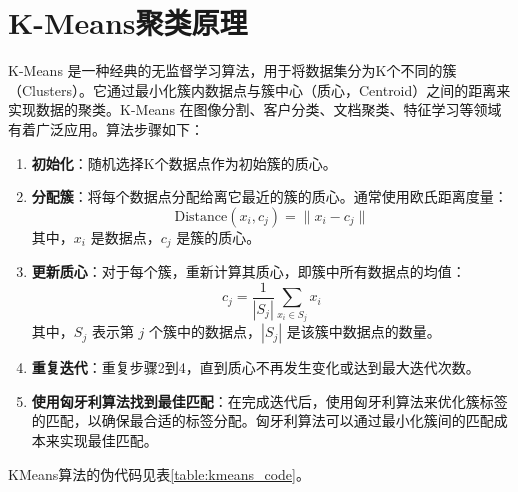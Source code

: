 \documentclass[master]{thesis-uestc}
\begin{document}
\section{K-Means聚类原理}
K-Means 是一种经典的无监督学习算法，用于将数据集分为K个不同的簇（Clusters）。它通过最小化簇内数据点与簇中心（质心，Centroid）之间的距离来实现数据的聚类。K-Means 在图像分割、客户分类、文档聚类、特征学习等领域有着广泛应用。算法步骤如下：
\begin{enumerate}[label={(\arabic*)}]
    \item \textbf{初始化}：随机选择K个数据点作为初始簇的质心。
    \item \textbf{分配簇}：将每个数据点分配给离它最近的簇的质心。通常使用欧氏距离度量：
    \[
    \text{Distance}(x_i, c_j) = \| x_i - c_j \|
    \]
    其中，\(x_i\) 是数据点，\(c_j\) 是簇的质心。
    \item \textbf{更新质心}：对于每个簇，重新计算其质心，即簇中所有数据点的均值：
    \[
    c_j = \frac{1}{|S_j|} \sum_{x_i \in S_j} x_i
    \]
    其中，\(S_j\) 表示第 \(j\) 个簇中的数据点，\(|S_j|\) 是该簇中数据点的数量。
    \item \textbf{重复迭代}：重复步骤2到4，直到质心不再发生变化或达到最大迭代次数。
    \item \textbf{使用匈牙利算法找到最佳匹配}：在完成迭代后，使用匈牙利算法来优化簇标签的匹配，以确保最合适的标签分配。匈牙利算法可以通过最小化簇间的匹配成本来实现最佳匹配。
\end{enumerate}
KMeans算法的伪代码见表\ref{table:kmeans_code}。
\end{document}
